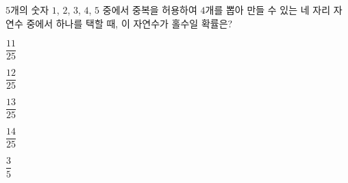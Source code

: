 $5$개의 숫자 $1$, $2$, $3$, $4$, $5$ 중에서 중복을 허용하여 $4$개를 뽑아 만들 수 있는 네 자리 자연수 중에서 하나를 택할 때, 이 자연수가 홀수일 확률은?
\begin{choices32}{\rule[-3ex]{0pt}{8ex}$\dfrac{11}{25}$}{\rule[-3ex]{0pt}{8ex}$\dfrac{12}{25}$}{\rule[-3ex]{0pt}{8ex}$\dfrac{13}{25}$}{\rule[-3ex]{0pt}{8ex}$\dfrac{14}{25}$}{\rule[-3ex]{0pt}{8ex}$\dfrac{3}{5}$}\end{choices32}
